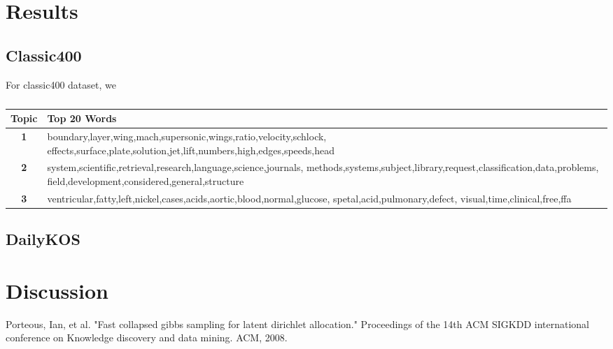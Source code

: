 \documentclass[twoside,12pt]{article}
\begin{document}
\section{Results}


\subsection{Classic400}
For classic400 dataset, we 


\begin{table}[!]
\begin{center}
\begin{tabular}{| c | p{12cm} |}
\hline
\textbf{Topic}& \textbf{Top 20 Words}  \\ \hline
\textbf{1}&boundary,layer,wing,mach,supersonic,wings,ratio,velocity,schlock, effects,surface,plate,solution,jet,lift,numbers,high,edges,speeds,head\\ \hline
\textbf{2}&system,scientific,retrieval,research,language,science,journals, methods,systems,subject,library,request,classification,data,problems, field,development,considered,general,structure\\
 \hline
\textbf{3}&ventricular,fatty,left,nickel,cases,acids,aortic,blood,normal,glucose, spetal,acid,pulmonary,defect, visual,time,clinical,free,ffa\\
 \hline
 
\end{tabular}
\caption{}
\label{table:2}
\end{center}
\end{table}


\subsection{DailyKOS}

\section{Discussion}


\begin{thebibliography}{9}
Porteous, Ian, et al. "Fast collapsed gibbs sampling for latent dirichlet allocation." Proceedings of the 14th ACM SIGKDD international conference on Knowledge discovery and data mining. ACM, 2008.

\end{thebibliography}
\end{document}
